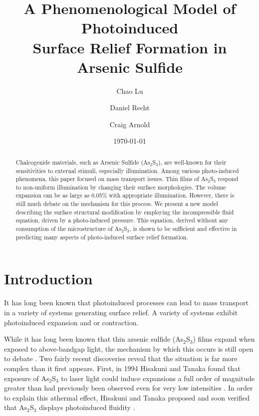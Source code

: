 \documentclass[twocolumn,showpacs,preprintnumbers,amsmath,amssymb]{revtex4}
\begin{document}

\title{A Phenomenological Model of Photoinduced\\ Surface Relief
  Formation in Arsenic Sulfide}

\author{Chao Lu}
\author{Daniel Recht}
\author{Craig Arnold}
\date{\today}

\begin{abstract}
Chalcogenide materials, such as Arsenic Sulfide (As$_2$S$_3$), are
well-known for their sensitivities to external stimuli, especially
illumination. Among various photo-induced phenomena, this paper
focused on mass transport issues. Thin films of As$_2$S$_3$ respond to
non-uniform illumination by changing their surface morphologies. The
volume expansion can be as large as 0.05\% with appropriate
illumination. However, there is still much debate on the mechanism for
this process. We present a new model describing the surface structural
modification by employing the incompressible fluid equation, driven by
a photo-induced pressure. This equation, derived without any
consumption of the microstructure of As$_2$S$_3$, is shown to be
sufficient and effective in predicting many aspects of photo-induced
surface relief formation.
\end{abstract}

\maketitle

\section{\label{sec:intro}Introduction}

It has long been known that photoinduced processes can lead to mass
transport in a variety of systems generating surface relief.  A
variety of systems exhibit photoinduced expansion and or contraction.

While it has long been known that thin arsenic sulfide
(As$_{2}$S$_{3}$) films expand when exposed to above-bandgap light,
the mechanism by which this occurs is still open to debate
\cite{igo74, hegedus, ganjoo}. Two fairly recent discoveries reveal
that the situation is far more complex than it first appears. First,
in 1994 Hisakuni and Tanaka found that exposure of As$_{2}$S$_{3}$ to
laser light could induce expansions a full order of magnitude greater
than had previously been observed even for very low intensities
\cite{hisakuni94}. In order to explain this athermal effect, Hisakuni
and Tanaka proposed and soon verified that As$_{2}$S$_{3}$ displays
photoinduced fluidity \cite{hisakuni95}.
\end{document}
